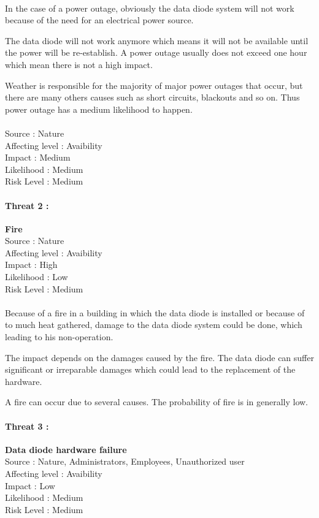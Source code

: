 \documentclass[a4paper,10pt]{article}
\begin{document}
\paragraph{}In the case of a power outage, obviously the data diode system will not work because of the need for an electrical power source. 

The data diode will not work anymore which means it will not be available until the power will be re-establish. A power outage usually does not exceed one hour which mean there is not a high impact.

Weather is responsible for the majority of major power outages that occur, but there are many others causes such as short circuits, blackouts and so on. Thus power outage has a medium likelihood to happen.    \\ \\
Source : Nature \\ 
Affecting level : Avaibility \\
Impact : Medium \\
Likelihood : Medium \\
Risk Level : Medium

\paragraph{Threat 2 :}  \textbf{Fire} \\ 
Source : Nature \\ 
Affecting level : Avaibility \\
Impact : High \\
Likelihood : Low \\
Risk Level : Medium
\paragraph{}Because of a fire in a building in which the data diode is installed or because of to much heat gathered, damage to the data diode system could be done, which leading to his non-operation.

The impact depends on the damages caused by the fire. The data diode can suffer significant or irreparable damages which could lead to the replacement of the hardware.

A fire can occur due to several causes. The probability of fire is in generally low.\\


\paragraph{Threat 3 :}  \textbf{Data diode hardware failure} \\ 
Source : Nature, Administrators, Employees, Unauthorized user \\ 
Affecting level : Avaibility \\
Impact : Low \\
Likelihood : Medium \\
Risk Level : Medium
\end{document}
